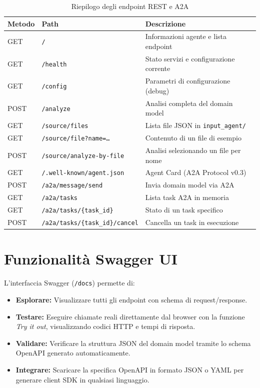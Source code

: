\documentclass[12pt,a4paper]{report}
\begin{document}
\begin{table}[H]
\centering
\renewcommand{\arraystretch}{1.3}
\begin{tabular}{llp{7cm}}
\toprule
\textbf{Metodo} & \textbf{Path} & \textbf{Descrizione} \\
\midrule
GET  & \texttt{/}                              & Informazioni agente e lista endpoint \\
GET  & \texttt{/health}                        & Stato servizi e configurazione corrente \\
GET  & \texttt{/config}                        & Parametri di configurazione (debug) \\
POST & \texttt{/analyze}                       & Analisi completa del domain model \\
GET  & \texttt{/source/files}                  & Lista file JSON in \texttt{input\_agent/} \\
GET  & \texttt{/source/file?name=\ldots}       & Contenuto di un file di esempio \\
POST & \texttt{/source/analyze-by-file}        & Analisi selezionando un file per nome \\
GET  & \texttt{/.well-known/agent.json}        & Agent Card (A2A Protocol v0.3) \\
POST & \texttt{/a2a/message/send}              & Invia domain model via A2A \\
GET  & \texttt{/a2a/tasks}                     & Lista task A2A in memoria \\
GET  & \texttt{/a2a/tasks/\{task\_id\}}        & Stato di un task specifico \\
POST & \texttt{/a2a/tasks/\{task\_id\}/cancel} & Cancella un task in esecuzione \\
\bottomrule
\end{tabular}
\caption{Riepilogo degli endpoint REST e A2A}
\label{tab:endpoints}
\end{table}
\section{Funzionalità Swagger UI}

L'interfaccia Swagger (\texttt{/docs}) permette di:
\begin{itemize}
  \item \textbf{Esplorare:} Visualizzare tutti gli endpoint con schema
        di request/response.
  \item \textbf{Testare:} Eseguire chiamate reali direttamente dal browser
        con la funzione \textit{Try it out}, visualizzando codici HTTP e
        tempi di risposta.
  \item \textbf{Validare:} Verificare la struttura JSON del domain model
        tramite lo schema OpenAPI generato automaticamente.
  \item \textbf{Integrare:} Scaricare la specifica OpenAPI in formato JSON
        o YAML per generare client SDK in qualsiasi linguaggio.
\end{itemize}
\end{document}
